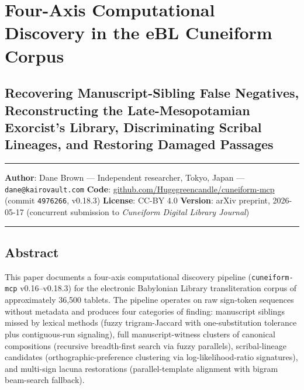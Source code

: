 \documentclass[
  11pt,
  letterpaper,
]{article}
\author{}
\date{}
\begin{document}
\section{Four-Axis Computational Discovery in the eBL Cuneiform
Corpus}\label{four-axis-computational-discovery-in-the-ebl-cuneiform-corpus}

\subsection{Recovering Manuscript-Sibling False Negatives,
Reconstructing the Late-Mesopotamian Exorcist's Library, Discriminating
Scribal Lineages, and Restoring Damaged
Passages}\label{recovering-manuscript-sibling-false-negatives-reconstructing-the-late-mesopotamian-exorcists-library-discriminating-scribal-lineages-and-restoring-damaged-passages}

\begin{center}\rule{0.5\linewidth}{0.5pt}\end{center}

\textbf{Author}: Dane Brown --- Independent researcher, Tokyo, Japan ---
\texttt{dane@kairovault.com} \textbf{Code}:
\href{https://github.com/Hugegreencandle/cuneiform-mcp}{github.com/Hugegreencandle/cuneiform-mcp}
(commit \texttt{4976266}, v0.18.3) \textbf{License}: CC-BY 4.0
\textbf{Version}: arXiv preprint, 2026-05-17 (concurrent submission to
\emph{Cuneiform Digital Library Journal})

\begin{center}\rule{0.5\linewidth}{0.5pt}\end{center}

\subsection{Abstract}\label{abstract}

This paper documents a four-axis computational discovery pipeline
(\texttt{cuneiform-mcp} v0.16--v0.18.3) for the electronic Babylonian
Library transliteration corpus of approximately 36,500 tablets. The
pipeline operates on raw sign-token sequences without metadata and
produces four categories of finding: manuscript siblings missed by
lexical methods (fuzzy trigram-Jaccard with one-substitution tolerance
plus contiguous-run signaling), full manuscript-witness clusters of
canonical compositions (recursive breadth-first search via fuzzy
parallels), scribal-lineage candidates (orthographic-preference
clustering via log-likelihood-ratio signatures), and multi-sign lacuna
restorations (parallel-template alignment with bigram beam-search
fallback).
\end{document}
